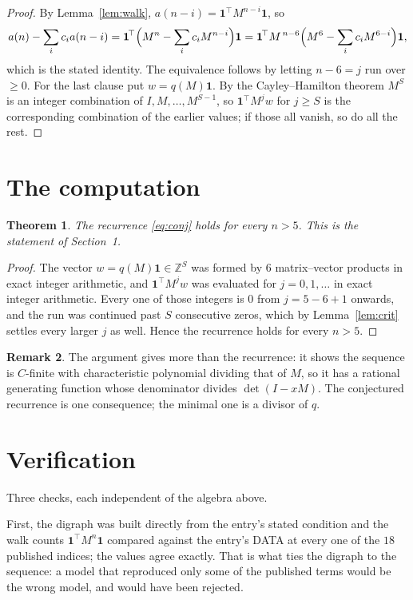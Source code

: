 \documentclass[11pt,a4paper]{article}
\theoremstyle{plain}
\newtheorem{theorem}{Theorem}
\theoremstyle{definition}
\newtheorem{remark}[theorem]{Remark}
\begin{document}
\begin{proof}
By Lemma~\ref{lem:walk}, $a(n-i)=\mathbf{1}^{\!\top}M^{n-i}\mathbf{1}$, so
\[
a(n)-\sum_i c_i a(n-i)
=\mathbf{1}^{\!\top}\Bigl(M^{n}-\sum_i c_i M^{n-i}\Bigr)\mathbf{1}
=\mathbf{1}^{\!\top}M^{\,n-6}\Bigl(M^{6}-\sum_i c_i M^{6-i}\Bigr)\mathbf{1},
\]
which is the stated identity. The equivalence follows by letting $n-6=j$ run over
$\ge0$. For the last clause put $w=q(M)\mathbf{1}$. By the Cayley--Hamilton theorem
$M^{S}$ is an integer combination of $I,M,\dots,M^{S-1}$, so
$\mathbf{1}^{\!\top}M^{j}w$ for $j\ge S$ is the corresponding combination of the
earlier values; if those all vanish, so do all the rest.
\end{proof}

\section{The computation}

\begin{theorem}
The recurrence \eqref{eq:conj} holds for every $n>5$. This is the statement of
Section~1.
\end{theorem}

\begin{proof}
The vector $w=q(M)\mathbf{1}\in\mathbb{Z}^{S}$ was formed by $6$ matrix--vector
products in exact integer arithmetic, and $\mathbf{1}^{\!\top}M^{j}w$ was evaluated for
$j=0,1,\dots$ in exact integer arithmetic. Every one of those integers is $0$ from
$j=5-6+1$ onwards, and the run was continued past $S$ consecutive zeros, which by
Lemma~\ref{lem:crit} settles every larger $j$ as well. Hence the recurrence holds for
every $n>5$.
\end{proof}

\begin{remark}
The argument gives more than the recurrence: it shows the sequence is $C$-finite with
characteristic polynomial dividing that of $M$, so it has a rational generating function
whose denominator divides $\det(I-xM)$. The conjectured recurrence is one consequence; the
minimal one is a divisor of $q$.
\end{remark}

\section{Verification}

Three checks, each independent of the algebra above.

First, the digraph was built directly from the entry's stated condition and the walk counts
$\mathbf{1}^{\!\top}M^{n}\mathbf{1}$ compared against the entry's DATA at every one of
the $18$ published indices; the values agree exactly. That is what ties the digraph to
the sequence: a model that reproduced only some of the published terms would be the wrong
model, and would have been rejected.
\end{document}
